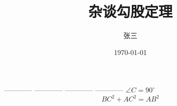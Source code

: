 \documentclass[UTF8]{ctexart}
\title{\heiti 杂谈勾股定理}
\author{\kaishu 张三}
\date{\today}
\newcommand\degree{^\circ}
\begin{document}
    \maketitle
    ------------
    ------------
    ------------
    ------------
    $\angle C=90\degree$
    \begin{equation}
        BC^2+AC^2=AB^2
    \end{equation} 
\end{document}
